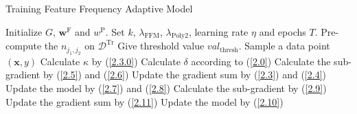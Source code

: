 \begin{algorithm}[ht]
\caption{Training Feature Frequency Adaptive Model}
\label{algo}
\begin{algorithmic}[1]
\renewcommand{\algorithmicrequire}{\textbf{Input}}
\STATE Initialize $G$, $\boldsymbol{w}^\text{F}$ and $w^\text{P}$.
\STATE Set $k$, $\lambda_\text{FFM}$, $\lambda_\text{Poly2}$, learning rate $\eta$ and epochs $T$.
\STATE Pre-compute the $n_{j_1,j_2}$ on $\mathcal{D}^\text{Tr}$
\STATE Give threshold value $val_\text{thresh}$.
\STATE Sample a data point $(\boldsymbol{x},y)$
\STATE Calculate $\kappa$ by (\ref{2.3.0})
\STATE Calculate $\delta$ according to (\ref{2.0})
\STATE Calculate the sub-gradient by (\ref{2.5}) and (\ref{2.6})
\STATE Update the gradient sum by (\ref{2.3}) and (\ref{2.4})
\STATE Update the model by (\ref{2.7}) and (\ref{2.8})
\ENDFOR
\ELSE
\STATE Calculate the sub-gradient by (\ref{2.9})
\STATE Update the gradient sum by (\ref{2.11})
\STATE Update the model by (\ref{2.10})
\ENDIF
\ENDFOR
\ENDFOR
\ENDFOR
\ENDWHILE
\end{algorithmic}
\end{algorithm}
